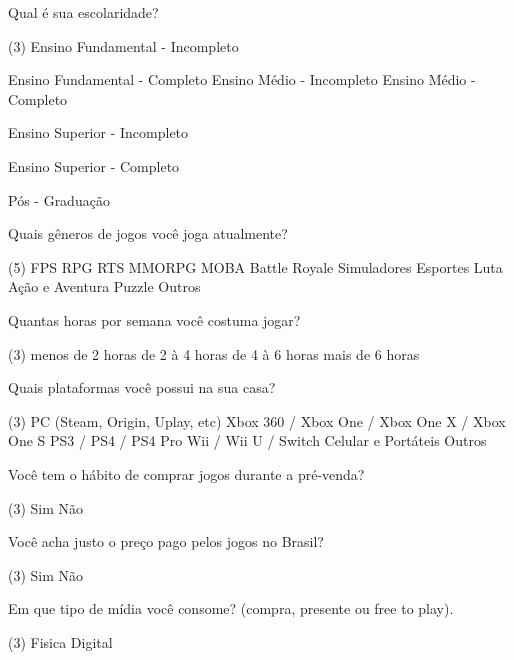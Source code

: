 \documentclass[11pt,a4paper]{article}
\begin{document}
\begin{question}
 	Qual é sua escolaridade?
	\begin{tasks}(3)
	\task Ensino Fundamental - Incompleto
	
	\task Ensino Fundamental - Completo
	\task Ensino Médio - Incompleto
	\task Ensino Médio - Completo
	
	\task Ensino Superior - Incompleto
	
	\task Ensino Superior - Completo
	
	\task Pós - Graduação
	\end{tasks}
\end{question}
\begin{question}
 	Quais gêneros de jogos você joga atualmente?
	\begin{tasks}(5)
	\task FPS
	\task RPG
	\task RTS
	\task MMORPG
	\task MOBA
	\task Battle Royale
	\task Simuladores
	\task Esportes
	\task Luta
	\task Ação e Aventura
	\task Puzzle
	\task Outros
	\end{tasks}
\end{question}
\begin{question}
	Quantas horas por semana você costuma jogar?
	\begin{tasks}(3)
	\task menos de 2 horas
	\task de 2 à 4 horas
	\task de 4 à 6 horas
	\task mais de 6 horas
	\end{tasks}
\end{question}
\begin{question}
	Quais plataformas você possui na sua casa?
	\begin{tasks}(3)
	\task PC (Steam, Origin, Uplay, etc)
	\task Xbox 360 / Xbox One / Xbox One X / Xbox One S
	\task PS3 / PS4 / PS4 Pro
	\task Wii / Wii U / Switch
	\task Celular e Portáteis
	\task Outros
	\end{tasks}
\end{question}
\begin{question}
	Você tem o hábito de comprar jogos durante a pré-venda?
	\begin{tasks}(3)
	\task Sim
	\task Não
	\end{tasks}
\end{question}
\begin{question}
	Você acha justo o preço pago pelos jogos no Brasil?
	\begin{tasks}(3)
	\task Sim
	\task Não
	\end{tasks}
\end{question}
\begin{question}
	Em que tipo de mídia você consome? (compra, presente ou free to play).
	\begin{tasks}(3)
	\task Fisica
	\task Digital
	\end{tasks}
\end{question}
\end{document}
